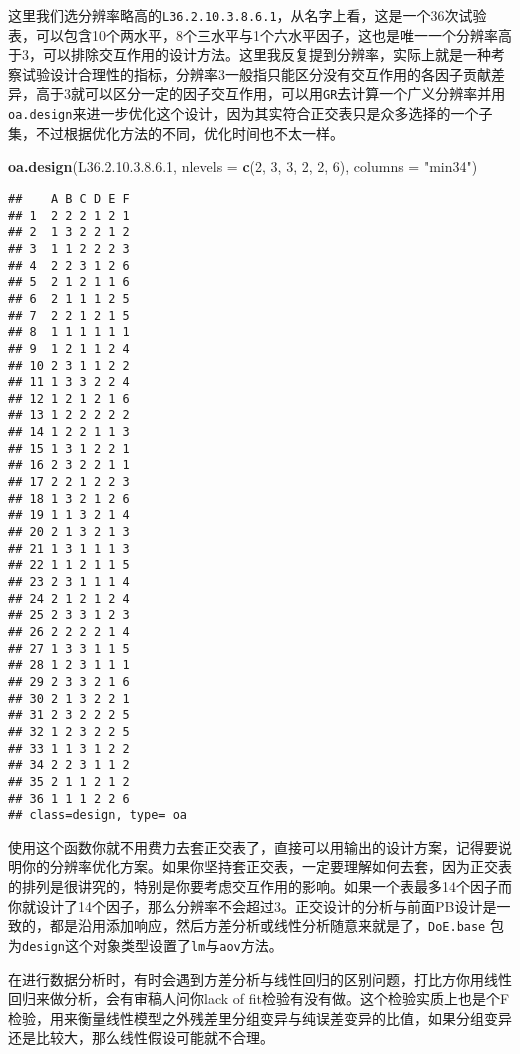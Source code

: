 \documentclass[]{tufte-book}
\newenvironment{Shaded}{}{}
\newcommand{\DataTypeTok}[1]{\textcolor[rgb]{0.56,0.13,0.00}{#1}}
\newcommand{\DecValTok}[1]{\textcolor[rgb]{0.25,0.63,0.44}{#1}}
\newcommand{\FloatTok}[1]{\textcolor[rgb]{0.25,0.63,0.44}{#1}}
\newcommand{\KeywordTok}[1]{\textcolor[rgb]{0.00,0.44,0.13}{\textbf{#1}}}
\newcommand{\NormalTok}[1]{#1}
\newcommand{\StringTok}[1]{\textcolor[rgb]{0.25,0.44,0.63}{#1}}
\begin{document}
这里我们选分辨率略高的\texttt{L36.2.10.3.8.6.1}，从名字上看，这是一个36次试验表，可以包含10个两水平，8个三水平与1个六水平因子，这也是唯一一个分辨率高于3，可以排除交互作用的设计方法。这里我反复提到分辨率，实际上就是一种考察试验设计合理性的指标，分辨率3一般指只能区分没有交互作用的各因子贡献差异，高于3就可以区分一定的因子交互作用，可以用\texttt{GR}去计算一个广义分辨率并用\texttt{oa.design}来进一步优化这个设计，因为其实符合正交表只是众多选择的一个子集，不过根据优化方法的不同，优化时间也不太一样。

\begin{Shaded}
\begin{Highlighting}[]
\KeywordTok{oa.design}\NormalTok{(L36.}\DecValTok{2}\NormalTok{.}\DecValTok{10}\NormalTok{.}\DecValTok{3}\NormalTok{.}\DecValTok{8}\NormalTok{.}\FloatTok{6.1}\NormalTok{, }\DataTypeTok{nlevels =} \KeywordTok{c}\NormalTok{(}\DecValTok{2}\NormalTok{, }\DecValTok{3}\NormalTok{, }
    \DecValTok{3}\NormalTok{, }\DecValTok{2}\NormalTok{, }\DecValTok{2}\NormalTok{, }\DecValTok{6}\NormalTok{), }\DataTypeTok{columns =} \StringTok{"min34"}\NormalTok{)}
\end{Highlighting}
\end{Shaded}

\begin{verbatim}
##    A B C D E F
## 1  2 2 2 1 2 1
## 2  1 3 2 2 1 2
## 3  1 1 2 2 2 3
## 4  2 2 3 1 2 6
## 5  2 1 2 1 1 6
## 6  2 1 1 1 2 5
## 7  2 2 1 2 1 5
## 8  1 1 1 1 1 1
## 9  1 2 1 1 2 4
## 10 2 3 1 1 2 2
## 11 1 3 3 2 2 4
## 12 1 2 1 2 1 6
## 13 1 2 2 2 2 2
## 14 1 2 2 1 1 3
## 15 1 3 1 2 2 1
## 16 2 3 2 2 1 1
## 17 2 2 1 2 2 3
## 18 1 3 2 1 2 6
## 19 1 1 3 2 1 4
## 20 2 1 3 2 1 3
## 21 1 3 1 1 1 3
## 22 1 1 2 1 1 5
## 23 2 3 1 1 1 4
## 24 2 1 2 1 2 4
## 25 2 3 3 1 2 3
## 26 2 2 2 2 1 4
## 27 1 3 3 1 1 5
## 28 1 2 3 1 1 1
## 29 2 3 3 2 1 6
## 30 2 1 3 2 2 1
## 31 2 3 2 2 2 5
## 32 1 2 3 2 2 5
## 33 1 1 3 1 2 2
## 34 2 2 3 1 1 2
## 35 2 1 1 2 1 2
## 36 1 1 1 2 2 6
## class=design, type= oa
\end{verbatim}

使用这个函数你就不用费力去套正交表了，直接可以用输出的设计方案，记得要说明你的分辨率优化方案。如果你坚持套正交表，一定要理解如何去套，因为正交表的排列是很讲究的，特别是你要考虑交互作用的影响。如果一个表最多14个因子而你就设计了14个因子，那么分辨率不会超过3。正交设计的分析与前面PB设计是一致的，都是沿用添加响应，然后方差分析或线性分析随意来就是了，\texttt{DoE.base} 包为\texttt{design}这个对象类型设置了\texttt{lm}与\texttt{aov}方法。

在进行数据分析时，有时会遇到方差分析与线性回归的区别问题，打比方你用线性回归来做分析，会有审稿人问你lack of fit检验有没有做。这个检验实质上也是个F检验，用来衡量线性模型之外残差里分组变异与纯误差变异的比值，如果分组变异还是比较大，那么线性假设可能就不合理。
\end{document}

